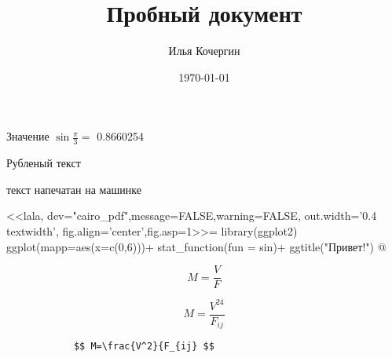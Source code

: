 \documentclass[a4paper]{article}\usepackage[]{graphicx}\usepackage[]{color}
\author{Илья Кочергин}
\title{Пробный документ}
\date{\today}
\begin{document}
  \maketitle
  
  
  Значение $\sin \frac{\pi}{3}=$ 0.8660254
  
  
  
  {
    \sffamily
    Рубленый текст	
  }
  
  {\ttfamily
  текст напечатан на машинке	
  }
  
<<lala, dev="cairo_pdf",message=FALSE,warning=FALSE,  out.width='0.4\\textwidth',  
fig.align='center',fig.asp=1>>=
library(ggplot2)
ggplot(mapp=aes(x=c(0,6)))+
  stat_function(fun = sin)+
  ggtitle("Привет!")
@

  
  \[ M=\frac{V}{F} \]
  
 $$ M=\frac{V^{24}}{F_{ij}} $$
 			
 
    	\begin{verbatim}
    		$$ M=\frac{V^2}{F_{ij} $$
    	\end{verbatim}  
\end{document}
